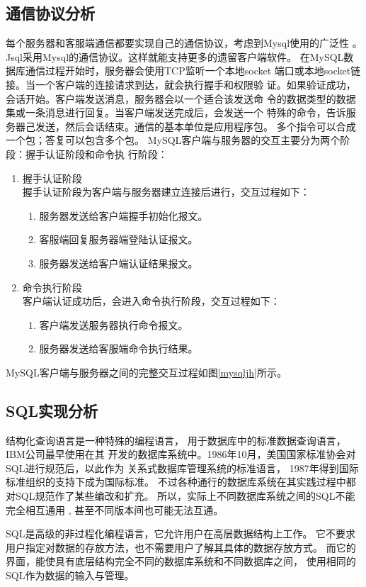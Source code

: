 \subsection{通信协议分析}
每个服务器和客服端通信都要实现自己的通信协议，考虑到Mysql使用的广泛性
。Jsql采用Mysql的通信协议。这样就能支持更多的遗留客户端软件。
在MySQL数据库通信过程开始时，服务器会使用TCP监听一个本地socket
端口或本地socket链接。当一个客户端的连接请求到达，就会执行握手和权限验
证。如果验证成功，会话开始。客户端发送消息，服务器会以一个适合该发送命
令的数据类型的数据集或一条消息进行回复。当客户端发送完成后，会发送一个
特殊的命令，告诉服务器己发送，然后会话结束。通信的基本单位是应用程序包。
多个指令可以合成一个包；答复可以包含多个包。
MySQL客户端与服务器的交互主要分为两个阶段：握手认证阶段和命令执
行阶段：
\begin{enumerate}
	\item 握手认证阶段\\
	握手认证阶段为客户端与服务器建立连接后进行，交互过程如下：
	\begin{enumerate}
		\item 服务器发送给客户端握手初始化报文。
		\item 客服端回复服务器端登陆认证报文。
		\item 服务器发送给客户端认证结果报文。
	\end{enumerate}
	\item 命令执行阶段\\
	客户端认证成功后，会进入命令执行阶段，交互过程如下：
	\begin{enumerate}
		\item 	客户端发送服务器执行命令报文。
		\item 服务器发送给客服端命令执行结果。
	\end{enumerate}
\end{enumerate}
MySQL客户端与服务器之间的完整交互过程如图\ref{mysqljh}所示。
\subsection{SQL实现分析}
结构化查询语言是一种特殊的编程语言，
用于数据库中的标准数据查询语言，IBM公司最早使用在其
开发的数据库系统中。1986年10月，美国国家标准协会对SQL进行规范后，以此作为
关系式数据库管理系统的标准语言，
1987年得到国际标准组织的支持下成为国际标准。
不过各种通行的数据库系统在其实践过程中都对SQL规范作了某些编改和扩充。
所以，实际上不同数据库系统之间的SQL不能完全相互通用 ,
 甚至不同版本间也可能无法互通。

SQL是高级的非过程化编程语言，它允许用户在高层数据结构上工作。
它不要求用户指定对数据的存放方法，也不需要用户了解其具体的数据存放方式。
而它的界面，能使具有底层结构完全不同的数据库系统和不同数据库之间，
使用相同的SQL作为数据的输入与管理。


